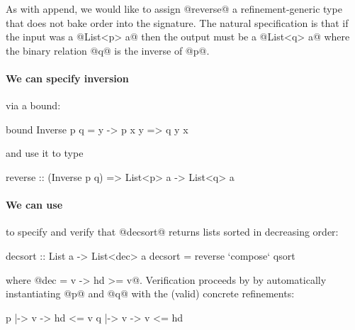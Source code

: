 As with append, we would like to assign @reverse@ a
refinement-generic type that does not bake order into the
signature. The natural specification is that if the input was a
@List<p> a@ then the output must be a @List<q> a@ where the
binary relation @q@ is the inverse of @p@.

\paragraph{We can specify inversion} via a bound:
%
\begin{code}
    bound Inverse p q = \x y -> p x y => q y x
\end{code}
%
and use it to type 
%
\begin{code}
    reverse :: (Inverse p q) 
            => List<p> a -> List<q> a
\end{code}

\paragraph{We can use } to specify and verify that @decsort@ 
returns lists sorted in decreasing order:
%
\begin{code}
    decsort :: List a -> List<dec> a
    decsort = reverse `compose` qsort
\end{code}
%
where @dec = \hd v -> hd >= v@. Verification proceeds by
by automatically instantiating @p@ and @q@ with the (valid) 
concrete refinements:
%
\begin{code}
    p |-> \hd v -> hd <= v
    q |-> \hd v -> v  <= hd
\end{code}


